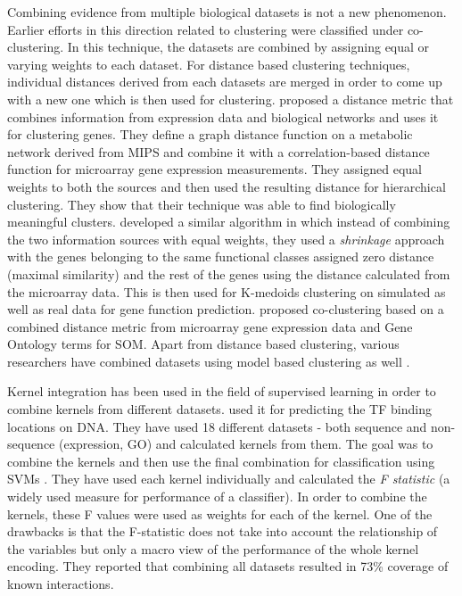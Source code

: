 Combining evidence from multiple biological datasets is not a new phenomenon. Earlier efforts in this direction 
related to clustering were classified under co-clustering. In this technique, the datasets are combined by assigning equal 
or varying weights to each dataset. For distance based clustering techniques, individual distances derived from each datasets 
are merged in order to come up with a new one which is then used for clustering. \citet{Hanisch2002Coclustering} 
proposed a distance metric that combines information from expression data and biological networks and uses it for clustering 
genes. They define a graph distance function on a metabolic network derived from MIPS \citep{Gueldener2006MPact} 
and combine it with a correlation-based distance function for microarray gene expression measurements. They assigned 
equal weights to both the sources and then used the resulting distance for hierarchical clustering. They show that their technique was 
able to find biologically meaningful clusters. \citet{huang2006incorporating} developed a similar algorithm in which 
instead of combining the two information sources with equal weights, they used a \textit{shrinkage} approach with the 
genes belonging to the same functional classes assigned zero distance (maximal similarity) and the rest of the genes using the distance 
calculated from the microarray data. This is then used for K-medoids clustering on simulated as well as real data for gene function 
prediction. \citet{bramier2007coclustering} proposed co-clustering based on a combined distance metric from microarray 
gene expression data and Gene Ontology terms for \ac{SOM}. Apart from distance based clustering, various researchers have combined datasets 
using model based clustering as well \citep{pan06incorporating}.

Kernel integration has been used in the field of supervised learning in order to combine kernels from different datasets. 
\citet{Holloway2006MachineLearning} used it for predicting the TF binding locations on DNA. They have used 18 different 
datasets - both sequence and non-sequence (expression, GO) and calculated kernels from them. The goal was to combine the kernels and then 
use the final combination for classification using \acp{SVM} . They have used each kernel individually and calculated the \textit{F statistic} 
(a widely used measure for performance of a classifier). In order to combine the kernels, these F values were used as weights 
for each of the kernel. One of the drawbacks is that the F-statistic does not take into account the relationship of the variables but 
only a macro view of the performance of the whole kernel encoding. They reported that combining all datasets resulted in 73\% coverage 
of known interactions. 

